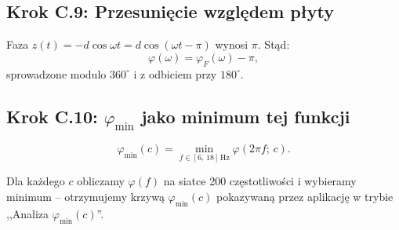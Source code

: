 \documentclass[11pt,a4paper]{article}
\theoremstyle{plainpol}
\begin{document}
\subsection*{Krok C.9: Przesunięcie względem płyty}

Faza $z(t) = -d\cos\omega t = d\cos(\omega t - \pi)$ wynosi $\pi$. Stąd:
\begin{equation}
  \boxed{\varphi(\omega) = \varphi_F(\omega) - \pi,}
\end{equation}
sprowadzone modulo $360^\circ$ i z odbiciem przy $180^\circ$.

\subsection*{Krok C.10: $\varphi_{\min}$ jako minimum tej funkcji}

\begin{equation}
  \varphi_{\min}(c) = \min_{f\in[6,\,18]\,\mathrm{Hz}} \varphi(2\pi f;\,c).
\end{equation}

Dla każdego $c$ obliczamy $\varphi(f)$ na siatce 200 częstotliwości i
wybieramy minimum -- otrzymujemy krzywą $\varphi_{\min}(c)$ pokazywaną
przez aplikację w trybie ,,Analiza $\varphi_{\min}(c)$''.
\end{document}
